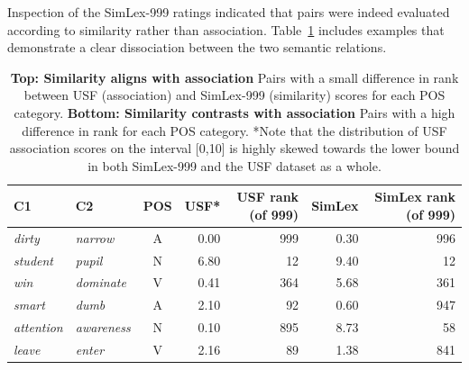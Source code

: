 Inspection of the SimLex-999 ratings indicated that pairs were indeed evaluated according to similarity rather than association. Table~\ref{tab2} includes examples that demonstrate a clear dissociation between the two semantic relations. 



 \begin{table}[t]\begin{center}\begin{tabular}{l|l|c|r|r|r|r}





C1 & C2 & POS & USF* & USF rank (of 999) & SimLex & SimLex rank (of 999) \\



\hline \emph{dirty} & \emph{narrow} & A & 0.00 & 999 & 0.30 & 996 \\



\emph{student} & \emph{pupil} & N & 6.80 & 12 & 9.40 & 12 \\

\emph{win} & \emph{dominate} & V & 0.41 & 364 & 5.68 & 361 \\



\hdashline \emph{smart} & \emph{dumb} & A & 2.10 & 92 & 0.60 & 947 \\

\emph{attention} & \emph{awareness} & N &  0.10 & 895 & 8.73 & 58 \\

\emph{leave} & \emph{enter} & V & 2.16 & 89 & 1.38 & 841 \\
\end{tabular}
\end{center}\caption{\label{tab2} {\bf Top:  Similarity aligns with association} Pairs with a small difference in rank between USF (association) and SimLex-999 (similarity) scores for each POS category. {\bf Bottom: Similarity contrasts with association} Pairs with a high difference in rank for each POS category. *Note that the distribution of USF association scores on the interval [0,10] is highly skewed towards the lower bound in both SimLex-999 and the USF dataset as a whole.}\end{table}

